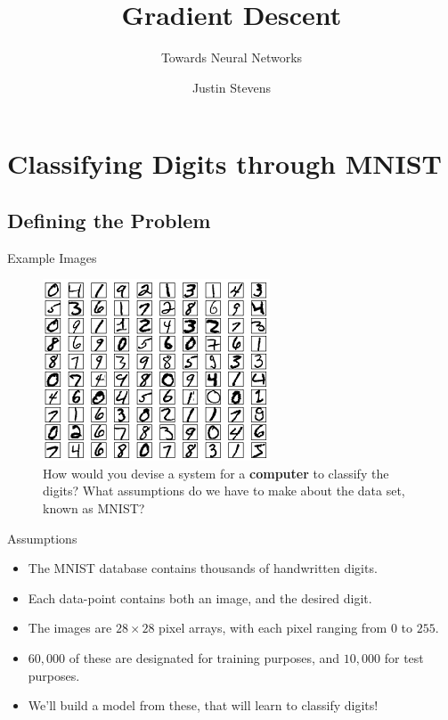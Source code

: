 \documentclass[xcolor=dvipsnames, fontsize=11pt, %
pagesize, %
parskip=half-, t]{beamer}
\title[Artificial Intelligence for Beginners]{Gradient Descent}
\subtitle{Towards Neural Networks}
\author[Justin Stevens]{\large Justin Stevens} %
\date{}
\begin{document}
	\renewcommand{\thefootnote}{\fnsymbol{footnote}}
	\begin{frame}[c]
	\centering
	\titlepage
\end{frame}
\section{Classifying Digits through MNIST}
\subsection{Defining the Problem}
\begin{frame}[c]{Example Images}
\begin{figure} 
\center
\includegraphics{mnist_100_digits.png}
\caption{How would you devise a system for a \textbf{computer} to classify the digits? What assumptions do we have to make about the data set, known as MNIST? }
\end{figure}
\end{frame}

\begin{frame}[c]{Assumptions}
\begin{itemize}
\item The MNIST database contains thousands of handwritten digits. 
\item Each data-point contains both an image, and the desired digit.
\item The images are $28\times 28$ pixel arrays, with each pixel ranging from $0$ to $255$. 
\item $60,000$ of these are designated for training purposes, and $10,000$ for test purposes.
\item We'll build a model from these, that will learn to classify digits!
\end{itemize}
\end{frame}
\end{document}
